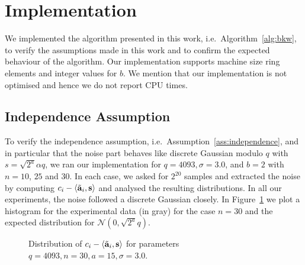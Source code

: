 \section{Implementation} \label{sec:implementation}
We implemented the algorithm presented in this work, i.e.\ Algorithm~\ref{alg:bkw}, to verify the assumptions made in this work and to confirm the expected behaviour of the algorithm. Our implementation supports machine size ring elements and integer values for $b$. We mention that our implementation is not optimised and hence we do not report CPU times. 

\subsection{Independence Assumption}\label{ss:independence}
To verify the independence assumption, i.e.\ Assumption~\ref{ass:independence}, and in particular that the noise part behaves like discrete Gaussian modulo $q$ with $s = \sqrt{2^a}\alpha q$, we ran our implementation for $q=4093,\sigma=3.0$, and $b=2$ with $n=10$, $25$ and $30$. In each case, we asked for $2^{20}$ samples and extracted the noise by computing $c_i - \dotp{\shortvec{a}_i}{\vec{s}}$ and analysed the resulting distributions. In all our experiments, the noise followed a discrete Gaussian closely. In Figure~\ref{fig:noise-n30} we plot a histogram for the experimental data (in gray) for the case $n=30$ and the expected distribution for $\mathcal{N}(0,\sqrt{2^a}q)$.

\begin{figure}
\begin{center}
\caption{Distribution of $c_i - \dotp{\shortvec{a}_i}{\vec{s}}$ for parameters $q=4093, n=30, a=15,\sigma = 3.0$.}
\label{fig:noise-n30}
\end{center}
\end{figure}


